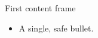 \begin{frame}{First content frame}
  \begin{itemize}\item A single, safe bullet.\end{itemize}
\end{frame}
